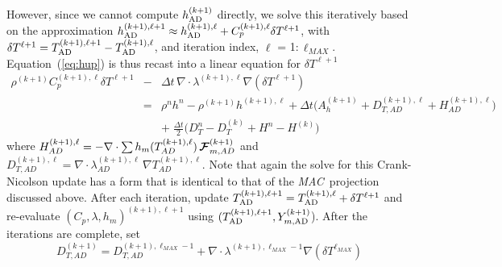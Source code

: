 However, since we cannot compute $h_{{\rm AD}}^{(k+1)}$ directly, we solve this iteratively based on the approximation
$h_{{\rm AD}}^{(k+1),\ell+1} \approx h_{{\rm AD}}^{(k+1),\ell} + C_{p}^{(k+1),\ell} \delta T^{\ell+1}$, with
$\delta T^{\ell+1} = T_{{\rm AD}}^{(k+1),\ell+1} - T_{{\rm AD}}^{(k+1),\ell}$, and iteration index, $\ell$ = 1:$\,\ell_{MAX}$.
Equation~(\ref{eq:hup}) is thus recast into a linear equation for $\delta T^{\ell+1}$
\begin{eqnarray}
\rho^{(k+1)} C_p^{(k+1),\ell} \delta T^{\ell +1}
 &-& \Delta t \, \nabla \cdot \lambda^{(k+1),\ell} \nabla (\delta T^{\ell +1}) \nonumber  \\
 &=& \rho^n h^n - \rho^{(k+1)} h^{(k+1),\ell} + \Delta t \Big( A_h^{(k+1)} + D_{T,AD}^{(k+1),\ell} + H_{AD}^{(k+1),\ell} \Big) \\
&&+ \; \frac{\Delta t}{2} \Big( D_T^n - D_T^{(k)} + H^n - H^{(k)} \Big) \nonumber
\end{eqnarray}
where $H_{AD}^{(k+1),\ell} = - \nabla \cdot \sum h_m(T_{AD}^{(k+1),\ell}) \, {\boldsymbol{\cal F}}_{m,AD}^{(k+1)}$
and $D_{T,AD}^{(k+1),\ell} = \nabla \cdot \lambda_{AD}^{(k+1),\ell} \, \nabla T_{AD}^{(k+1),\ell}$.
Note that again the solve for this
Crank-Nicolson update has a form that is identical to that of
the \textit{MAC}\ projection discussed above.  After each 
iteration, update $T_{{\rm AD}}^{(k+1),\ell+1} = T_{{\rm AD}}^{(k+1),\ell} + \delta T^{\ell+1}$ and 
re-evaluate $(C_p,\lambda,h_m)^{(k+1),\ell+1}$ using $(T_{{\rm AD}}^{(k+1),\ell+1}, Y_{m,{\rm AD}}^{(k+1)}$).
After the iterations are complete, set
\begin{equation*}
D_{T,AD}^{(k+1)} = D_{T,AD}^{(k+1),\ell_{MAX}-1} + \nabla \cdot \lambda^{(k+1),\ell_{MAX}-1} \nabla (\delta T^{\ell_{MAX}})
\end{equation*}

